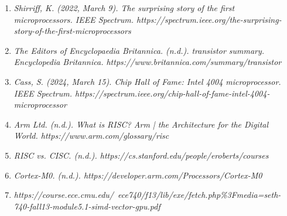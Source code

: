 \documentclass[9pt,a4paper,twoside]{tau}
\begin{document}
\begin{enumerate}

    \item \textit{Shirriff, K. (2022, March 9). The surprising story of the first microprocessors. IEEE Spectrum. https://spectrum.ieee.org/the-surprising-story-of-the-first-microprocessors}
    
    \item \textit{The Editors of Encyclopaedia Britannica. (n.d.). transistor summary. Encyclopedia Britannica. https://www.britannica.com/summary/transistor}

    
    \item \textit{Cass, S. (2024, March 15). Chip Hall of Fame: Intel 4004 microprocessor. IEEE Spectrum. https://spectrum.ieee.org/chip-hall-of-fame-intel-4004-microprocessor}
    \item \textit{Arm Ltd. (n.d.). What is RISC? Arm | the Architecture for the Digital World. https://www.arm.com/glossary/risc}
    \item \textit{RISC vs. CISC. (n.d.). https://cs.stanford.edu/people/eroberts/courses}
    \item \textit{Cortex-M0. (n.d.). https://developer.arm.com/Processors/Cortex-M0}
    \item \textit{https://course.ece.cmu.edu/~ece740/f13/lib/exe/fetch.php\%3Fmedia=seth-740-fall13-module5.1-simd-vector-gpu.pdf}




\end{enumerate}




\printbibliography

\end{document}
